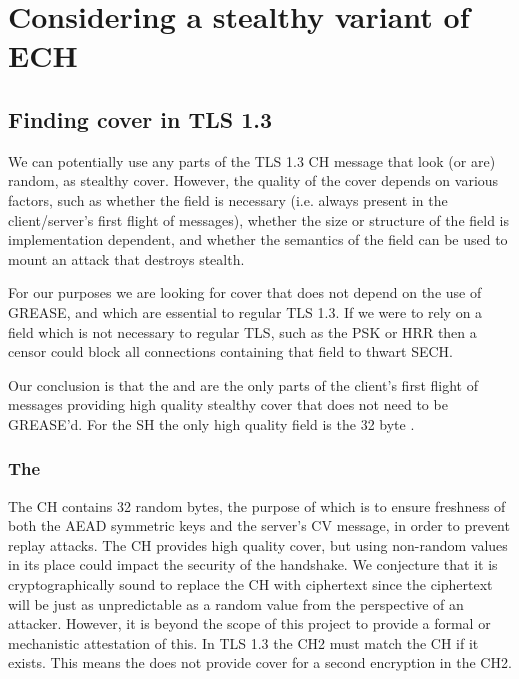 \section{Considering a stealthy variant of ECH}
\subsection{Finding cover in TLS 1.3}
\label{sec:sech-cover-constraints}
We can potentially use any parts of the TLS 1.3 \ac{CH} message that look (or are) random,
as stealthy cover.
However, the quality of the cover depends on
various factors,
such as whether the field is necessary (i.e. always present in the client/server's first flight of messages),
whether the size or structure of the field
is implementation dependent,
and whether the semantics of the field can be used
to mount an attack that destroys stealth.

For our purposes we are looking for cover that does not depend
on the use of \ac{GREASE},
and which are essential to regular \ac{TLS} 1.3.
If we were to rely on a field which
is not necessary to regular \ac{TLS},
such as the \ac{PSK} or \ac{HRR}
then a censor could block all
connections containing that field to thwart \ac{SECH}.

Our conclusion is that the 
and  are the only parts of the client's first flight
of messages providing high quality stealthy cover that does not need to be \ac{GREASE}'d.
For the \ac{SH} the only high quality field is the 32 byte .

\subsubsection{The }
The \ac{CH} contains 32 random bytes, the purpose of which is to
ensure freshness of both the \ac{AEAD} symmetric keys
and the server's \ac{CV} message,
in order to prevent replay attacks.
The \ac{CH} provides high quality cover,
but using non-random values in its place could impact the security of the handshake.
We conjecture that it is cryptographically sound
to replace the \ac{CH} with ciphertext
since the ciphertext will be just as unpredictable as a random value from the perspective of an attacker.
However, it is beyond the scope of this project to
provide a formal or mechanistic attestation of this.
In \ac{TLS} 1.3 the \ac{CH2} must match the \ac{CH} if it exists. This means the  does not provide cover for a second encryption in the \ac{CH2}.


